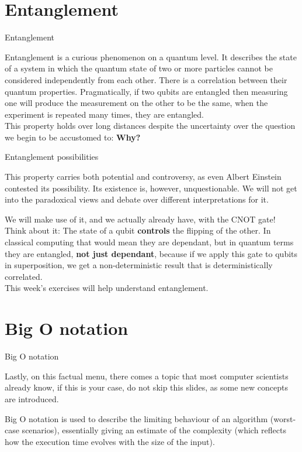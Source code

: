 \documentclass[aspectratio=43]{beamer}
\begin{document}
\section{Entanglement}
\begin{frame}{Entanglement}
\begin{card}
    Entanglement is a curious phenomenon on a quantum level. It describes the state of a system in which the quantum state of two or more particles cannot be considered independently from each other. There is a correlation between their quantum properties. Pragmatically, if two qubits are entangled then measuring one will produce the measurement on the other to be the same, when the experiment is repeated many times, they are entangled.\\ This property holds over long distances despite the uncertainty over the question we begin to be accustomed to: \textbf{Why?}
\end{card}
\pagenumber
\end{frame}

\begin{frame}{Entanglement possibilities}
\begin{cardTiny}
    This property carries both potential and controversy, as even Albert Einstein contested its possibility. Its existence is, however, unquestionable. We will not get into the paradoxical views and debate over different interpretations for it.
\end{cardTiny}
\begin{cardTiny}
    We will make use of it, and we actually already have, with the CNOT gate! Think about it: The state of a qubit \textbf{controls} the flipping of the other. In classical computing that would mean they are dependant, but in quantum terms they are entangled, \textbf{not just dependant}, because if we apply this gate to qubits in superposition, we get a non-deterministic result that is deterministically correlated.\\
    \small{This week's exercises will help understand entanglement.}
\end{cardTiny}
\pagenumber
\end{frame}

\section{Big O notation}
\begin{frame}{Big O notation}
\begin{card}
Lastly, on this factual menu, there comes a topic that most computer scientists already know, if this is your case, do not skip this slides, as some new concepts are introduced.
\end{card}
\begin{card}
Big O notation is used to describe the limiting behaviour of an algorithm (worst-case scenarios), essentially giving an estimate of the complexity (which reflects how the execution time evolves with the size of the input). 
\end{card}
\pagenumber
\end{frame}
\end{document}
